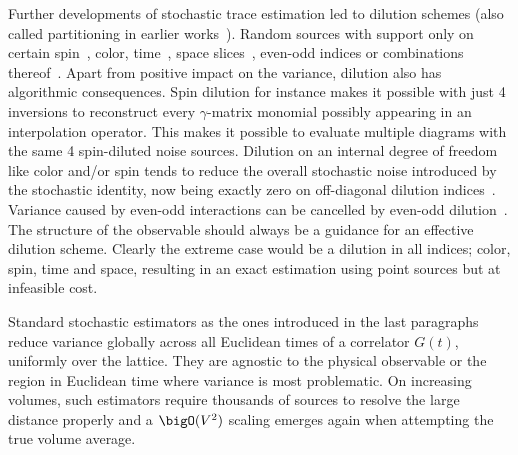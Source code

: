 Further developments of stochastic trace estimation led to dilution schemes (also called partitioning in earlier works~\cite{Wilcox:1999ab}).
Random sources with support only on certain spin~\cite{Wilcox:1997rm,Alexandrou:2010jr}, color, time~\cite{GUSKEN1989,OCais:2004xgm,Bali:2014pva}, space slices~\cite{Foley:2005ac}, even-odd indices or combinations thereof~\cite{Morningstar:2008mc,Bulava:2008qx,Foley:2010vv,Morningstar:2008ph}.
Apart from positive impact on the variance, dilution also has algorithmic consequences.
Spin dilution for instance makes it possible with just \num{4} inversions to reconstruct every $\gamma$-matrix monomial possibly appearing in an interpolation operator.
This makes it possible to evaluate multiple diagrams with the same \num{4} spin-diluted noise sources.
Dilution on an internal degree of freedom like color and/or spin tends to reduce the overall stochastic noise introduced by the stochastic identity, now being exactly zero on off-diagonal dilution indices~\cite{Babich:2010at,Morningstar:2011ka}.
Variance caused by even-odd interactions can be cancelled by even-odd dilution~\cite{Bali_2009,Foley:2005ac,Morningstar:2011ka}.
The structure of the observable should always be a guidance for an effective dilution scheme.
Clearly the extreme case would be a dilution in all indices; color, spin, time and space, resulting in an exact estimation using point sources but at infeasible cost.

Standard stochastic estimators as the ones introduced in the last paragraphs reduce variance globally across all Euclidean times of a correlator $G(t)$, \ie uniformly over the lattice.
They are agnostic to the physical observable or the region in Euclidean time where variance is most problematic.
On increasing volumes, such estimators require thousands of sources to resolve the large distance properly and a $\bigO(V^{2})$ scaling emerges again when attempting the true volume average.

